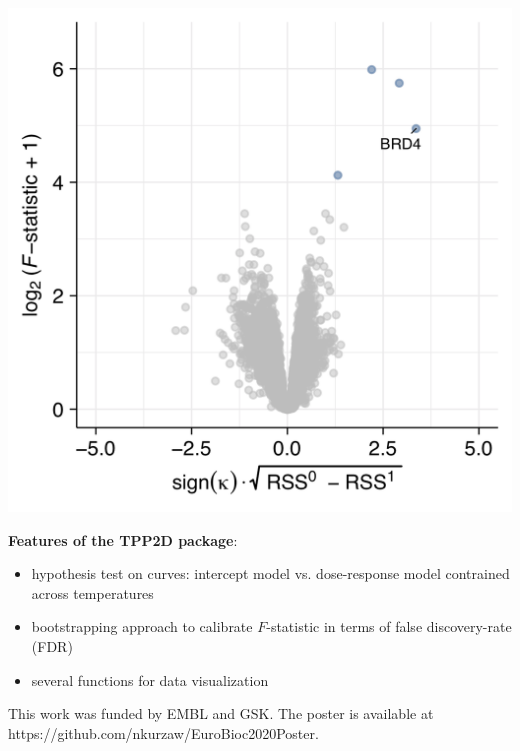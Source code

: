 \documentclass{article}
\newcommand{\hcode}[2][lgray]{{\ttfamily\color{vdgray}\colorbox{#1}{#2}}}
\begin{document}
\begin{multicols}{2}
\begin{minipage}[t]{\linewidth}
  \begin{minipage}{0.4\linewidth}
  \includegraphics[width=\linewidth]{figs/tpp2d_volcano.png}
  \end{minipage}%
  \begin{minipage}{0.6\linewidth}
  \textbf{Features of the \hcode{TPP2D} package}:
% 
  \begin{itemize}
%
  \item hypothesis test on curves: intercept model vs. dose-response model contrained across temperatures
  \item bootstrapping approach to calibrate $F$-statistic in terms of false discovery-rate (FDR)
  \item several functions for data visualization
%
  \end{itemize}
  \end{minipage}
  
\end{minipage}

\scriptsize
 


\noindent
This work was funded by EMBL and GSK. The poster is available at {\color{blue}
{https://github.com/nkurzaw/EuroBioc2020Poster}}.

\end{multicols}
\end{document}
